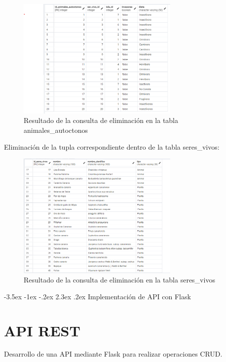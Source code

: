 \documentclass[11pt]{report}
\makeatletter
\renewcommand\chapter{\@startsection{chapter}{0}{\z@}%
    {-3.5ex \@plus -1ex \@minus -.2ex}%
    {2.3ex \@plus.2ex}%
    {\normalfont\Large\bfseries}}
\makeatother
\begin{document}
\begin{figure}[H]
      \centering
      \includegraphics[width=0.7\textwidth]{src/img/tabla_animales_autoctonos_despues_delete.png}
      \caption{Resultado de la consulta de eliminación en la tabla animales\_autoctonos}
      \label{fig:delete_animales_autoctonos}
\end{figure}

Eliminación de la tupla correspondiente dentro de la tabla seres\_vivos:

\begin{figure}[H]
      \centering
      \includegraphics[width=0.7\textwidth]{src/img/tabla_seres_vivos_despues_delete.png}
      \caption{Resultado de la consulta de eliminación en la tabla seres\_vivos}
      \label{fig:delete_seres_vivos}
\end{figure}

\chapter{Implementación de API con Flask}

\section{API REST}
Desarrollo de una API mediante Flask para realizar operaciones CRUD.
\end{document}
